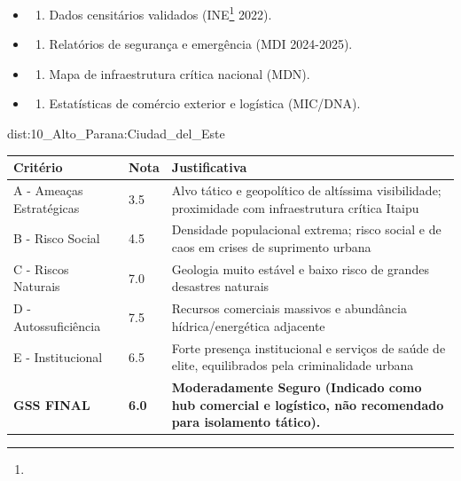 {\begin{itemize}
\tightlist
\item
  \begin{enumerate}
  \def\labelenumi{\arabic{enumi})}
  \tightlist
  \item
    Dados censitários validados (INE\footnote{\fineINE} 2022).
  \end{enumerate}
\item
  \begin{enumerate}
  \def\labelenumi{\arabic{enumi})}
  \setcounter{enumi}{1}
  \tightlist
  \item
    Relatórios de segurança e emergência (MDI 2024-2025).
  \end{enumerate}
\item
  \begin{enumerate}
  \def\labelenumi{\arabic{enumi})}
  \setcounter{enumi}{2}
  \tightlist
  \item
    Mapa de infraestrutura crítica nacional (MDN).
  \end{enumerate}
\item
  \begin{enumerate}
  \def\labelenumi{\arabic{enumi})}
  \setcounter{enumi}{3}
  \tightlist
  \item
    Estatísticas de comércio exterior e logística (MIC/\allowbreak DNA).
  \end{enumerate}
\end{itemize}}{dist:10_Alto_Parana:Ciudad_del_Este}
\begin{table}[ht!]
\small \begin{tabular}{p{3.0cm}p{0.8cm}p{6.0cm}} \toprule
\textbf{Critério} & \textbf{Nota} & \textbf{Justificativa} \\ \midrule
A - Ameaças Estratégicas & 3.5 & Alvo tático e geopolítico de altíssima visibilidade; proximidade com infraestrutura crítica Itaipu \\
B - Risco Social & 4.5 & Densidade populacional extrema; risco social e de caos em crises de suprimento urbana \\
C - Riscos Naturais & 7.0 & Geologia muito estável e baixo risco de grandes desastres naturais \\
D - Autossuficiência & 7.5 & Recursos comerciais massivos e abundância hídrica/\allowbreak energética adjacente \\
E - Institucional & 6.5 & Forte presença institucional e serviços de saúde de elite, equilibrados pela criminalidade urbana \\
\midrule \textbf{GSS FINAL} & \textbf{6.0} & \textbf{Moderadamente Seguro (Indicado como hub comercial e logístico, não recomendado para isolamento tático).} \\ \bottomrule \end{tabular}
\end{table}
